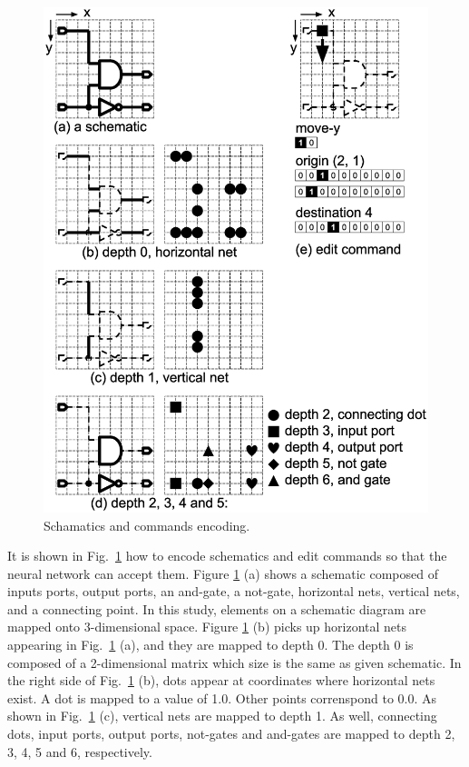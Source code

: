 \documentclass[twocolumn]{article}
\begin{document}
\begin{figure}[!tp]
 \begin{center}
  \begin{minipage}{\hsize}
   \includegraphics[width=\hsize]{fig/encode_01.eps}
   \caption{Schamatics and commands encoding.}
   \label{fig:encode}
  \end{minipage}
 \end{center}
\end{figure}

It is shown in Fig.\ \ref{fig:encode} how to encode
schematics and edit commands so that the neural network can accept them.
Figure \ref{fig:encode} (a) shows a schematic composed of
inputs ports, output ports, an and-gate, a not-gate,
horizontal nets, vertical nets, and a connecting point.
In this study, elements on a schematic diagram are
mapped onto 3-dimensional space.
Figure \ref{fig:encode} (b) picks up horizontal nets appearing
in Fig.\ \ref{fig:encode} (a), and they are mapped to depth 0.
The depth 0 is composed of a 2-dimensional matrix which size is the same
as given schematic.
In the right side of Fig.\ \ref{fig:encode} (b),
dots appear at coordinates where horizontal nets exist.
A dot is mapped to a value of 1.0.
Other points correnspond to 0.0.
As shown in Fig.\ \ref{fig:encode} (c),
vertical nets are mapped to depth 1.
As well, connecting dots, input ports, output ports, not-gates and and-gates
are mapped to depth 2, 3, 4, 5 and 6, respectively.
\end{document}

